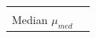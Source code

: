 \documentclass[
]{article}
\begin{document}
\begin{longtable}[]{@{}
  >{\raggedright\arraybackslash}p{}
  >{\raggedright\arraybackslash}p{}@{}}
                                                                                                                                                                                                                                                                                                                                                                                                                                                                                                                                                                                                                                                                                                                                                                                                                                                                                                                                                                                                      \) \\
Median \(\mu_{med}\) & \(                                                                                                                                                                                                                                                                                                                                                                                                                                                                                                                                                                                                                                                                                                                                                                                                                                                                                                                                                                                                                                                                                                                                                                   

\end{longtable}
\end{document}
